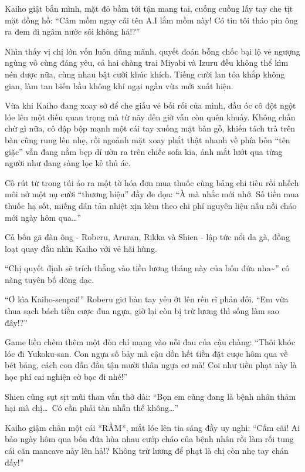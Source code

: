 \documentclass[../main.tex]{subfiles}
\begin{document}
Kaiho giật bắn mình, mặt đỏ bầm tới tận mang tai, cuống cuồng lấy tay che tịt mặt đồng hồ: ``Câm mồm ngay cái tên A.I lắm mồm này! Có tin tôi tháo pin ông ra đem đi ngâm nước sôi không hả!?''

Nhìn thấy vị chị lớn vốn luôn dũng mãnh, quyết đoán bỗng chốc bại lộ vẻ ngượng ngùng vô cùng đáng yêu, cả hai chàng trai Miyabi và Izuru đều không thể kìm nén được nữa, cùng nhau bật cười khúc khích. Tiếng cười lan tỏa khắp không gian, làm tan biến bầu không khí ngại ngần vừa mới xuất hiện.

Vừa khi Kaiho đang xoay sở để che giấu vẻ bối rối của mình, đầu óc cô đột ngột lóe lên một điều quan trọng mà từ nãy đến giờ vẫn còn quên khuấy. Không chần chừ gì nữa, cô đập bộp mạnh một cái tay xuống mặt bàn gỗ, khiến tách trà trên bàn cũng rung lên nhẹ, rồi ngoảnh mặt xoay phắt thật nhanh về phía bốn ``tên giặc'' vẫn đang nằm bẹp dí ườn ra trên chiếc sofa kia, ánh mắt lướt qua từng người như đang sàng lọc kẻ thủ ác.

Cô rút từ trong túi áo ra một tờ hóa đơn mua thuốc cùng bảng chi tiêu rồi nhếch môi nở một nụ cười ``thương hiệu'' đầy đe dọa: ``À mà nhắc mới nhớ. Số tiền mua thuốc hạ sốt, miếng dán tản nhiệt xịn kèm theo chi phí nguyên liệu nấu nồi cháo mới ngày hôm qua\dots''

Cả bốn gã đàn ông - Roberu, Aruran, Rikka và Shien - lập tức nổi da gà, đồng loạt quay đầu nhìn Kaiho với vẻ hãi hùng.

``Chị quyết định sẽ trích thẳng vào tiền lương tháng này của bốn đứa nha\~{}'' cô nàng tuyên bố dõng dạc.

``Ơ kìa Kaiho-senpai!'' Roberu giơ bàn tay yếu ớt lên rền rĩ phản đối. ``Em vừa thua sạch bách tiền cược đua ngựa, giờ lại còn bị trừ lương thì sống làm sao đây!?''

Game liền chêm thêm một đòn chí mạng vào nỗi đau của cậu chàng: ``Thôi khóc lóc đi Yukoku-san. Con ngựa số bảy mà cậu dồn hết tiền đặt cược hôm qua về bét bảng, cách con dẫn đầu tận mười thân ngựa cơ mà! Coi như tiền phạt này là học phí cai nghiện cờ bạc đi nhé!''

Shien cũng sụt sịt mũi than vắn thở dài: ``Bọn em cũng đang là bệnh nhân thảm hại mà chị\dots\ Có cần phải tàn nhẫn thế không\dots''

Kaiho giậm chân một cái *RẦM*, mắt lóe lên tia sáng đầy uy nghi: ``Cấm cãi! Ai bảo ngày hôm qua bốn đứa hùa nhau cướp cháo của bệnh nhân rồi làm rối tung cái căn mancave này lên hả!? Không trừ lương để phạt là chị còn nhẹ tay chán đấy!''
\end{document}
